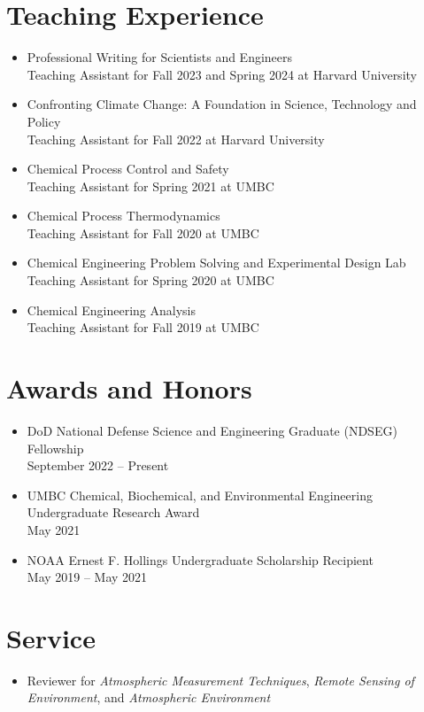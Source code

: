 \documentclass[10pt]{article}
\begin{document}
\section*{Teaching Experience}
\begin{itemize}
    \itemsep0em 
    \item Professional Writing for Scientists and Engineers\\
    Teaching Assistant for Fall 2023 and Spring 2024 at Harvard University
    \item Confronting Climate Change: A Foundation in Science, Technology and Policy\\
    Teaching Assistant for Fall 2022 at Harvard University
    \item Chemical Process Control and Safety\\
    Teaching Assistant for Spring 2021 at UMBC
    \item Chemical Process Thermodynamics\\
    Teaching Assistant for Fall 2020 at UMBC
    \item Chemical Engineering Problem Solving and Experimental Design Lab\\
    Teaching Assistant for Spring 2020 at UMBC
    \item Chemical Engineering Analysis\\
    Teaching Assistant for Fall 2019 at UMBC
\end{itemize}

\section*{Awards and Honors}
\begin{itemize}
    \itemsep0em 
    \item DoD National Defense Science and Engineering Graduate (NDSEG) Fellowship\\
    September 2022 -- Present
    \item UMBC Chemical, Biochemical, and Environmental Engineering Undergraduate Research Award\\
    May 2021
    \item NOAA Ernest F. Hollings Undergraduate Scholarship Recipient\\
    May 2019 -- May 2021
\end{itemize}

\section*{Service}
\begin{itemize}
    \itemsep0em 
    \item Reviewer for \textit{Atmospheric Measurement Techniques}, \textit{Remote Sensing of Environment}, and \textit{Atmospheric Environment}
\end{itemize}
\end{document}
